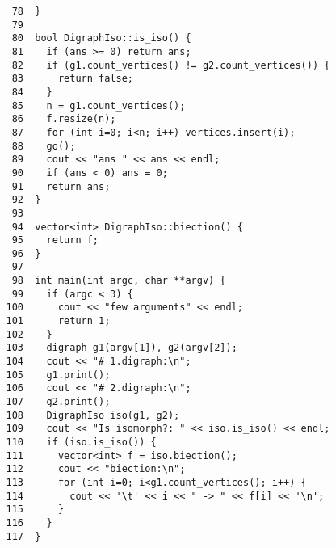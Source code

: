 \begin{verbatim}
    78	}
    79	
    80	bool DigraphIso::is_iso() {
    81	  if (ans >= 0) return ans;
    82	  if (g1.count_vertices() != g2.count_vertices()) {
    83	    return false;
    84	  }
    85	  n = g1.count_vertices();
    86	  f.resize(n);
    87	  for (int i=0; i<n; i++) vertices.insert(i);
    88	  go();
    89	  cout << "ans " << ans << endl;
    90	  if (ans < 0) ans = 0;
    91	  return ans;
    92	}
    93	
    94	vector<int> DigraphIso::biection() {
    95	  return f;
    96	}
    97	
    98	int main(int argc, char **argv) {
    99	  if (argc < 3) {
   100	    cout << "few arguments" << endl;
   101	    return 1;
   102	  }
   103	  digraph g1(argv[1]), g2(argv[2]);
   104	  cout << "# 1.digraph:\n";
   105	  g1.print();
   106	  cout << "# 2.digraph:\n";
   107	  g2.print();
   108	  DigraphIso iso(g1, g2);
   109	  cout << "Is isomorph?: " << iso.is_iso() << endl;
   110	  if (iso.is_iso()) {
   111	    vector<int> f = iso.biection();
   112	    cout << "biection:\n";
   113	    for (int i=0; i<g1.count_vertices(); i++) {
   114	      cout << '\t' << i << " -> " << f[i] << '\n';
   115	    }
   116	  }
   117	}
\end{verbatim}

